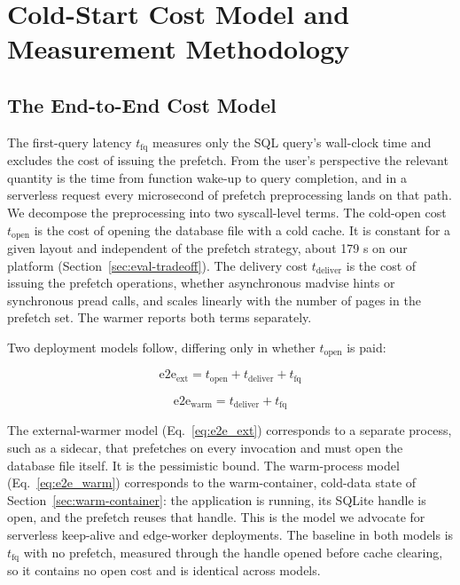 \documentclass[sigconf, nonacm]{acmart}
\begin{document}
\section{Cold-Start Cost Model and Measurement Methodology}\label{sec:methodology}

\subsection{The End-to-End Cost Model}\label{sec:cost-model}

The first-query latency $t_{\text{fq}}$ measures only the SQL query's wall-clock time and excludes the cost of issuing the prefetch. From the user's perspective the relevant quantity is the time from function wake-up to query completion, and in a serverless request every microsecond of prefetch preprocessing lands on that path. We decompose the preprocessing into two syscall-level terms. The cold-open cost $t_{\text{open}}$ is the cost of opening the database file with a cold cache. It is constant for a given layout and independent of the prefetch strategy, about 179 \textmu s on our platform (Section~\ref{sec:eval-tradeoff}). The delivery cost $t_{\text{deliver}}$ is the cost of issuing the prefetch operations, whether asynchronous madvise hints or synchronous pread calls, and scales linearly with the number of pages in the prefetch set. The warmer reports both terms separately.

Two deployment models follow, differing only in whether $t_{\text{open}}$ is paid:

\begin{equation}\label{eq:e2e_ext}
    \text{e2e}_{\text{ext}} = t_{\text{open}} + t_{\text{deliver}} + t_{\text{fq}}
\end{equation}

\begin{equation}\label{eq:e2e_warm}
    \text{e2e}_{\text{warm}} = t_{\text{deliver}} + t_{\text{fq}}
\end{equation}

The external-warmer model (Eq.~\ref{eq:e2e_ext}) corresponds to a separate process, such as a sidecar, that prefetches on every invocation and must open the database file itself. It is the pessimistic bound. The warm-process model (Eq.~\ref{eq:e2e_warm}) corresponds to the warm-container, cold-data state of Section~\ref{sec:warm-container}: the application is running, its SQLite handle is open, and the prefetch reuses that handle. This is the model we advocate for serverless keep-alive and edge-worker deployments. The baseline in both models is$t_{\text{fq}}$ with no prefetch, measured through the handle opened before cache clearing, so it contains no open cost and is identical across models.
\end{document}
